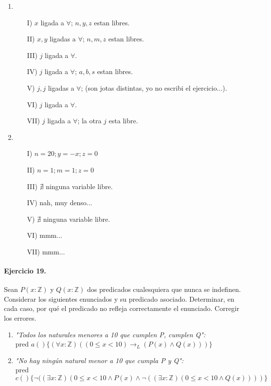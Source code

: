 \documentclass[a4paper]{article}
\begin{document}
\begin{enumerate}[label=\alph*)]
\item
\begin{itemize}
\item[I)] $ x$ ligada a $\forall$; $n,y,z$ estan libres.
\item[II)] $ x,y$ ligadas a $\forall$; $n,m,z$ estan libres.
\item[III)] $ j$ ligada a $\forall$.
\item[IV)] $ j$ ligada a $\forall$; $a,b,s$ estan libres.
\item[V)]  $ j,j$ ligadas a $\forall$; (son jotas distintas, yo no escribi el ejercicio...).
\item[VI)] $ j$ ligada a $\forall$.
\item[VII)] $ j$ ligada a $\forall$; la otra $j$ esta libre.
\end{itemize}
\item
\begin{itemize}
\item[I)] $n=20;y=-x;z=0$
\item[II)] $n=1;m=1;z=0$
\item[III)] $\nexists$ ninguna variable libre.
\item[IV)] nah, muy denso...
\item[V)] $\nexists$ ninguna variable libre.
\item[VI)] mmm...
\item[VII)] mmm...
\end{itemize}
\end{enumerate}

\paragraph{\textbf{Ejercicio 19.}} Sean $P(x: \mathbb{Z})$ y $Q(x: \mathbb{Z})$ dos predicados cualesquiera que nunca se indefinen. Considerar los siguientes enunciados y su predicado asociado. Determinar, en cada caso, por qué el predicado no refleja correctamente el enunciado.
Corregir los errores.
\begin{enumerate}[label=\alph*)]
\item \textit{"Todos los naturales menores a 10 que cumplen P, cumplen Q":}\\
 pred $a()\{(\forall x: \mathbb{Z})((0 \leq x < 10)\rightarrow _L(P(x)\wedge Q(x)))\}$
\item \textit{"No hay ningún natural menor a 10 que cumpla P y Q":}\\
 pred $c()\{\neg ((\exists x: \mathbb{Z} )(0 \leq x <10 \wedge P(x)\wedge \neg ((\exists x: \mathbb{Z} )(0 \leq x <10 \wedge Q(x))))\}$
\end{enumerate}
\end{document}
